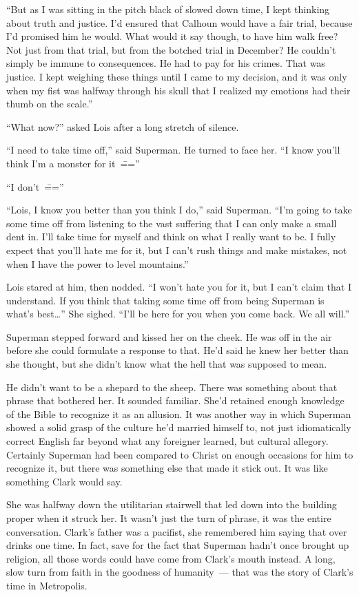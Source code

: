 \documentclass[ebook,12pt]{memoir}
\begin{document}
``But as I was sitting in the pitch black of slowed down time, I kept
thinking about truth and justice. I'd ensured that Calhoun would have a
fair trial, because I'd promised him he would. What would it say though,
to have him walk free? Not just from that trial, but from the botched
trial in December? He couldn't simply be immune to consequences. He had
to pay for his crimes. That was justice. I kept weighing these things
until I came to my decision, and it was only when my fist was halfway
through his skull that I realized my emotions had their thumb on the
scale.''

``What now?'' asked Lois after a long stretch of silence.

``I need to take time off,'' said Superman. He turned to face her. ``I
know you'll think I'm a monster for it~\===''

``I don't~\===''

``Lois, I know you better than you think I do,'' said Superman. ``I'm
going to take some time off from listening to the vast suffering that I
can only make a small dent in. I'll take time for myself and think on
what I really want to be. I fully expect that you'll hate me for it, but
I can't rush things and make mistakes, not when I have the power to
level mountains.''

Lois stared at him, then nodded. ``I won't hate you for it, but I can't
claim that I understand. If you think that taking some time off from
being Superman is what's best\ldots{}'' She sighed. ``I'll be here for
you when you come back. We all will.''

Superman stepped forward and kissed her on the cheek. He was off in the
air before she could formulate a response to that. He'd said he knew her
better than she thought, but she didn't know what the hell that was
supposed to mean.

He didn't want to be a shepard to the sheep. There was something about
that phrase that bothered her. It sounded familiar. She'd retained
enough knowledge of the Bible to recognize it as an allusion. It was
another way in which Superman showed a solid grasp of the culture he'd
married himself to, not just idiomatically correct English far beyond
what any foreigner learned, but cultural allegory. Certainly Superman
had been compared to Christ on enough occasions for him to recognize it,
but there was something else that made it stick out. It was like
something Clark would say.

She was halfway down the utilitarian stairwell that led down into the
building proper when it struck her. It wasn't just the turn of phrase,
it was the entire conversation. Clark's father was a pacifist, she
remembered him saying that over drinks one time. In fact, save for the
fact that Superman hadn't once brought up religion, all those words
could have come from Clark's mouth instead. A long, slow turn from faith
in the goodness of humanity~--- that was the story of Clark's time in
Metropolis.
\end{document}
